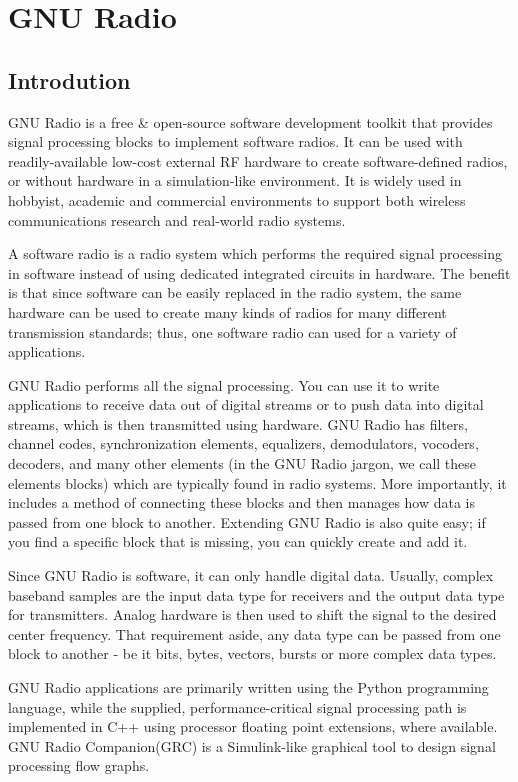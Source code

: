\documentclass[a4paper,10pt]{report}
\begin{document}
\tableofcontents

\chapter{GNU Radio}

\section{Introdution}
GNU Radio\cite{bib:gnuradio} is a free \& open-source software development toolkit
that provides signal processing blocks to implement software radios.
It can be used with readily-available low-cost external RF hardware
to create software-defined radios, or without hardware in a simulation-like environment.
It is widely used in hobbyist, academic and commercial environments 
to support both wireless communications research and real-world radio systems.

A software radio is a radio system which performs the required signal processing 
in software instead of using dedicated integrated circuits in hardware.
The benefit is that since software can be easily replaced in the radio system,
the same hardware can be used to create many kinds of radios for many different transmission standards;
thus, one software radio can used for a variety of applications.

GNU Radio performs all the signal processing.
You can use it to write applications to receive data out of digital streams 
or to push data into digital streams, which is then transmitted using hardware.
GNU Radio has filters, channel codes, synchronization elements, equalizers,
demodulators, vocoders, decoders, and many other elements 
(in the GNU Radio jargon, we call these elements blocks) which are typically found in radio systems.
More importantly, it includes a method of connecting these blocks 
and then manages how data is passed from one block to another.
Extending GNU Radio is also quite easy; if you find a specific block that is missing, you can quickly create and add it.

Since GNU Radio is software, it can only handle digital data.
Usually, complex baseband samples are the input data type for receivers and the output data type for transmitters.
Analog hardware is then used to shift the signal to the desired center frequency.
That requirement aside, any data type can be passed from one block to another 
- be it bits, bytes, vectors, bursts or more complex data types.

GNU Radio applications are primarily written using the Python programming language, 
while the supplied, performance-critical signal processing path is implemented in C++
using processor floating point extensions, where available.
GNU Radio Companion(GRC) is a Simulink-like graphical tool to design signal processing flow graphs.
\end{document}
